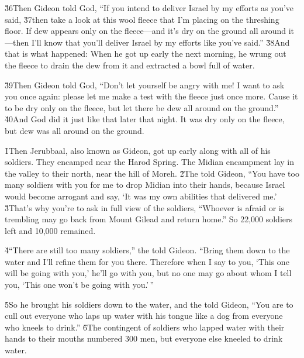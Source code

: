 \v{36}Then Gideon told God, ``If you intend to deliver Israel by my efforts as you've said, \v{37}then take a look at this wool fleece that I'm placing on the threshing floor. If dew appears only on the fleece---and it's dry on the ground all around it---then I'll know that you'll deliver Israel by my efforts like you've said.'' \v{38}And that is what happened: When he got up early the next morning, he wrung out the fleece to drain the dew from it and extracted a bowl full of water.

\v{39}Then Gideon told God, ``Don't let yourself be angry with me! I want to ask you once again: please let me make a test with the fleece just once more. Cause it to be dry only on the fleece, but let there be dew all around on the ground.'' \v{40}And God did it just like that later that night. It was dry only on the fleece, but dew was all around on the ground.

\v{1}Then Jerubbaal, also known as Gideon, got up early along with all of his soldiers. They encamped near the Harod Spring. The Midian encampment lay in the valley to their north, near the hill of Moreh. \v{2}The  told Gideon, ``You have too many soldiers with you for me to drop Midian into their hands, because Israel would become arrogant and say, `It was my own abilities that delivered me.' \v{3}That's why you're to ask in full view of the soldiers, ``Whoever is afraid or is trembling may go back from Mount Gilead and return home.'' So 22,000 soldiers left and 10,000 remained.

\v{4}``There are still too many soldiers,'' the  told Gideon. ``Bring them down to the water and I'll refine them for you there. Therefore when I say to you, `This one will be going with you,' he'll go with you, but no one may go about whom I tell you, `This one won't be going with you.'\,''

\v{5}So he brought his soldiers down to the water, and the  told Gideon, ``You are to cull out everyone who laps up water with his tongue like a dog from everyone who kneels to drink.'' \v{6}The contingent of soldiers who lapped water with their hands to their mouths numbered 300 men, but everyone else kneeled to drink water.

